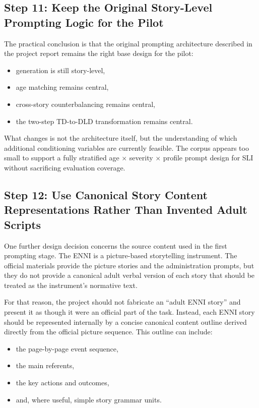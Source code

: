 \subsection{Step 11: Keep the Original Story-Level Prompting Logic for the Pilot}

The practical conclusion is that the original prompting architecture described in the project report remains the right base design for the pilot:

\begin{itemize}
    \item generation is still story-level,
    \item age matching remains central,
    \item cross-story counterbalancing remains central,
    \item the two-step TD-to-DLD transformation remains central.
\end{itemize}

What changes is not the architecture itself, but the understanding of which additional conditioning variables are currently feasible. The corpus appears too small to support a fully stratified age \(\times\) severity \(\times\) profile prompt design for SLI without sacrificing evaluation coverage.

\subsection{Step 12: Use Canonical Story Content Representations Rather Than Invented Adult Scripts}

One further design decision concerns the source content used in the first prompting stage. The ENNI is a picture-based storytelling instrument. The official materials provide the picture stories and the administration prompts, but they do not provide a canonical adult verbal version of each story that should be treated as the instrument's normative text.

For that reason, the project should not fabricate an ``adult ENNI story'' and present it as though it were an official part of the task. Instead, each ENNI story should be represented internally by a concise canonical content outline derived directly from the official picture sequence. This outline can include:

\begin{itemize}
    \item the page-by-page event sequence,
    \item the main referents,
    \item the key actions and outcomes,
    \item and, where useful, simple story grammar units.
\end{itemize}

